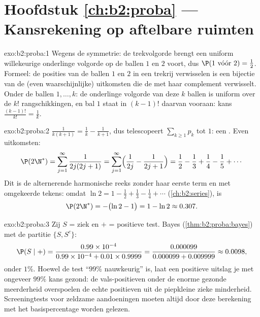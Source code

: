 \section*{Hoofdstuk \ref{ch:b2:proba} --- Kansrekening op aftelbare ruimten}

\begin{solution}{exo:b2:proba:1}
Wegens de symmetrie: de trekvolgorde brengt een uniform
willekeurige onderlinge volgorde op de ballen $1$ en $2$ voort, dus
$\P(1 \text{ vóór } 2) = \frac12$. Formeel: de posities van de
ballen $1$ en $2$ in een trekrij verwisselen is een bijectie van de
(even waarschijnlijke) uitkomsten die de  met haar
complement verwisselt. Onder de ballen $1, \dots, k$: de onderlinge
volgorde van deze $k$ ballen is uniform over de $k!$
rangschikkingen, en bal $1$ staat in $(k-1)!$ daarvan vooraan:
kans $\frac{(k-1)!}{k!} = \frac1k$.
\end{solution}

\begin{solution}{exo:b2:proba:2}
$\frac{1}{k(k+1)} = \frac1k - \frac1{k+1}$, dus telescopeert
$\sum_{k\geq1} p_k$ tot $1$: een . Even uitkomsten:
\[
\P(2\N^*) = \sum_{j=1}^{\infty}\frac{1}{2j(2j+1)}
= \sum_{j=1}^{\infty}\Bigl(\frac{1}{2j} - \frac{1}{2j+1}\Bigr)
= \frac12 - \frac13 + \frac14 - \frac15 + \cdots
\]
Dit is de alternerende harmonische reeks zonder haar eerste term en
met omgekeerde tekens: omdat $\ln 2 = 1 - \frac12 + \frac13 -
\frac14 + \cdots$ (\cref{ch:b2:series}), is
\[
\P(2\N^*) = -\bigl(\ln 2 - 1\bigr) = 1 - \ln 2 \approx 0.307 .
\]
\end{solution}

\begin{solution}{exo:b2:proba:3}
Zij $S$ = ziek en $+$ = positieve test. Bayes
(\cref{thm:b2:proba:bayes}) met de partitie $\{S, S^c\}$:
\[
\P(S \mid +)
= \frac{0.99 \times 10^{-4}}
       {0.99 \times 10^{-4} + 0.01 \times 0.9999}
= \frac{0.000099}{0.000099 + 0.009999}
\approx 0.0098 ,
\]
onder $1\%$. Hoewel de test ``$99\%$ nauwkeurig'' is, laat een
positieve uitslag je met ongeveer $99\%$ kans gezond: de
vals-positieven onder de enorme gezonde meerderheid overspoelen de
echte positieven uit de piepkleine zieke minderheid. Screeningtests
voor zeldzame aandoeningen moeten altijd door deze berekening met
het basispercentage worden gelezen.
\end{solution}

